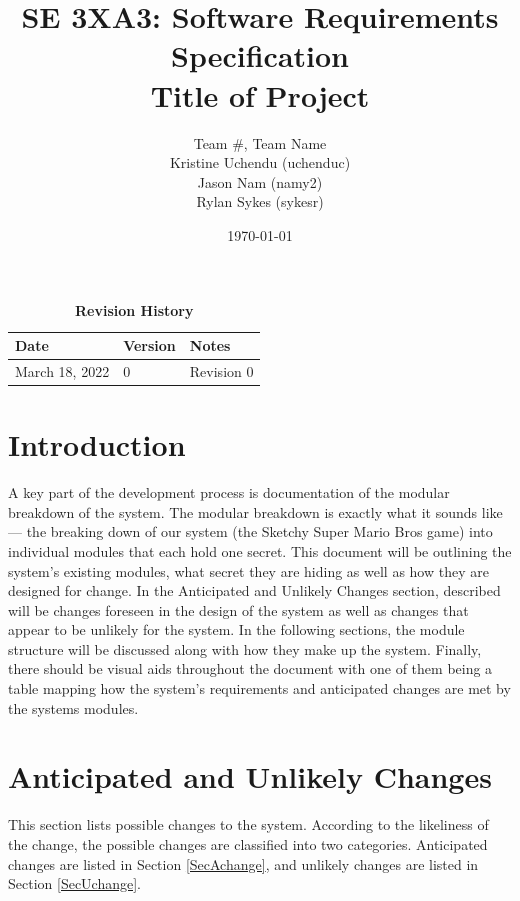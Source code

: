 \documentclass[12pt, titlepage]{article}
\title{SE 3XA3: Software Requirements Specification\\Title of Project}
\author{Team \#, Team Name
		\\ Kristine Uchendu (uchenduc)
		\\ Jason Nam (namy2)
		\\ Rylan Sykes (sykesr)
}
\date{\today}
\begin{document}
\maketitle

\tableofcontents
\listoftables
\listoffigures

\begin{table}[bp]
\caption{\bf Revision History}
\begin{tabularx}{\textwidth}{p{3cm}p{2cm}X}
\toprule {\bf Date} & {\bf Version} & {\bf Notes}\\
\midrule
March 18, 2022 & 0 & Revision 0\\
\bottomrule
\end{tabularx}
\end{table}

\newpage


\section{Introduction}

A key part of the development process is documentation of the modular breakdown of the system. The modular breakdown is exactly what it sounds like — the breaking down of our system (the Sketchy Super Mario Bros game) into individual modules that each hold one secret. This document will be outlining the system’s existing modules, what secret they are hiding as well as how they are designed for change. In the Anticipated and Unlikely Changes section, described will be changes foreseen in the design of the system as well as changes that appear to be unlikely for the system. In the following sections, the module structure will be discussed along with how they make up the system. Finally, there should be visual aids throughout the document with one of them being a table mapping how the system’s requirements and anticipated changes are met by the systems modules.

\section{Anticipated and Unlikely Changes} \label{SecChange}

This section lists possible changes to the system. According to the likeliness
of the change, the possible changes are classified into two
categories. Anticipated changes are listed in Section \ref{SecAchange}, and
unlikely changes are listed in Section \ref{SecUchange}.
\end{document}
